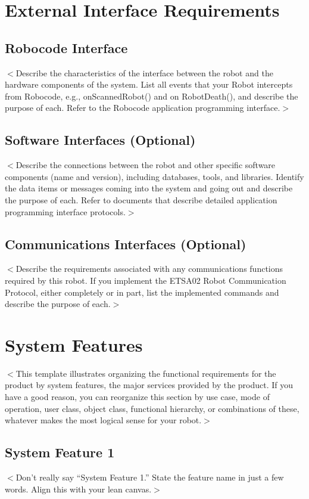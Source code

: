 \documentclass{scrreprt}
\begin{document}
\chapter{External Interface Requirements}

\section{Robocode Interface}
$<$Describe the characteristics of the interface between the robot and the hardware components of the system. List all events that your Robot intercepts from Robocode, e.g., onScannedRobot() and on RobotDeath(), and describe the purpose of each. Refer to the Robocode application programming interface.$>$

\section{Software Interfaces (Optional)}
$<$Describe the connections between the robot and other specific software components (name and version), including databases, tools, and libraries. Identify the data items or messages coming into the system and going out and describe the purpose of each. Refer to documents that describe detailed application programming interface protocols.$>$

\section{Communications Interfaces (Optional)}
$<$Describe the requirements associated with any communications functions required by this robot. If you implement the ETSA02 Robot Communication Protocol, either completely or in part, list the implemented commands and describe the purpose of each.$>$

\chapter{System Features}
$<$This template illustrates organizing the functional requirements for the product by system features, the major services provided by the product. If you have a good reason, you can reorganize this section by use case, mode of operation, user class, object class, functional hierarchy, or combinations of these, whatever makes the most logical sense for your robot.$>$

\section{System Feature 1}
$<$Don't really say ``System Feature 1.'' State the feature name in just a few words. Align this with your lean canvas.$>$
\end{document}
